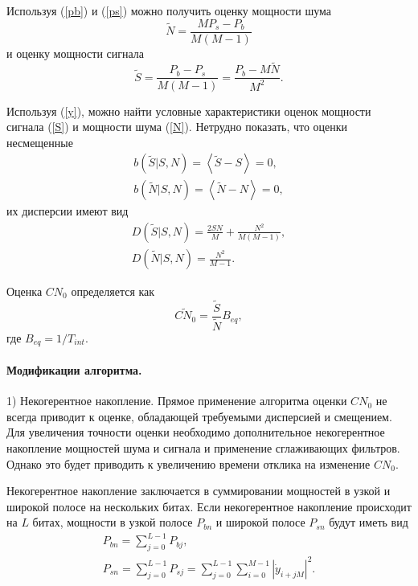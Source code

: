 \documentclass{article}
\begin{document}
Используя (\ref{pb}) и (\ref{ps}) можно получить оценку мощности шума
\begin{equation} \label{N}
\widetilde{N} = \frac{MP_{s}-P_{b}}{M(M-1)}
\end{equation}
и оценку мощности сигнала
\begin{equation} \label{S}
\widetilde{S} = \frac{P_{b}-P_{s}}{M(M-1)} = \frac{P_{b}-M\widetilde{N}}{M^{2}}.
\end{equation}

Используя (\ref{y}), можно найти условные характеристики оценок мощности сигнала (\ref{S}) и мощности шума (\ref{N}). Нетрудно показать, что оценки несмещенные
\begin{gather}
b(\widetilde{S}|S, N) = \left<\widetilde{S}-S\right> = 0, \\
b(\widetilde{N}|S, N) = \left<\widetilde{N}-N\right> = 0,
\end{gather}
их дисперсии имеют вид
\begin{gather}
D(\widetilde{S}|S, N) = \frac{2SN}{M} + \frac{N^{2}}{M(M-1)}, \\
D(\widetilde{N}|S, N) = \frac{N^{2}}{M-1}.
\end{gather}

Оценка $CN_{0}$ определяется как
\begin{equation} \label{cn0_est}
\widetilde{CN_{0}} = \frac{\widetilde{S}}{\widetilde{N}}B_{eq},
\end{equation}
где $B_{eq} = 1/T_{int}$.

\paragraph{Модификации алгоритма. \\}
1) Некогерентное накопление. Прямое применение алгоритма оценки $CN_{0}$ не всегда приводит к оценке, обладающей требуемыми дисперсией и смещением. Для увеличения точности оценки необходимо дополнительное некогерентное накопление мощностей шума и сигнала и применение сглаживающих фильтров. Однако это будет приводить к увеличению времени отклика на изменение $CN_{0}$.

Некогерентное накопление заключается в суммировании мощностей в узкой и широкой полосе на нескольких битах. Если некогерентное накопление происходит на $L$ битах, мощности в узкой полосе $P_{bn}$ и широкой полосе $P_{sn}$ будут иметь вид
\begin{gather}
P_{bn} = \sum_{j=0}^{L-1}P_{bj}, \\
P_{sn} = \sum_{j=0}^{L-1}P_{sj} = \sum_{j=0}^{L-1} \sum_{i=0}^{M-1}\left|\dot{y}_{i+jM}\right|^{2}.
\end{gather}
\end{document}
